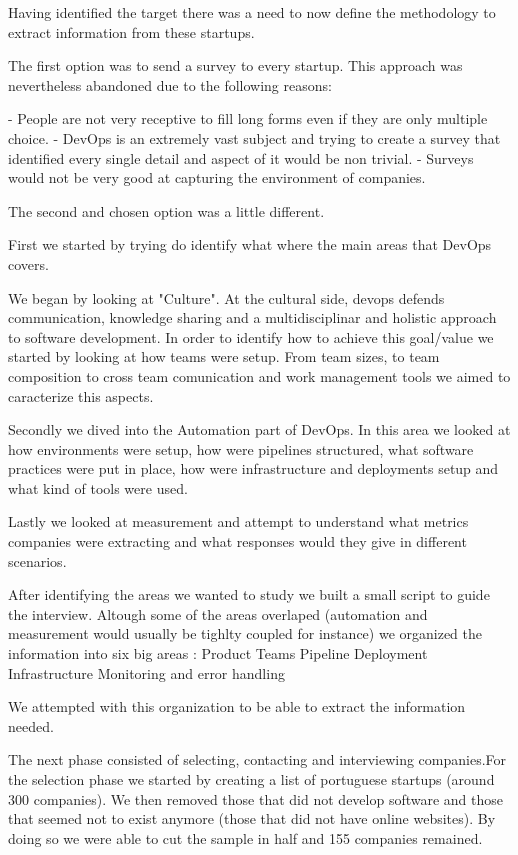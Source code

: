Having identified the target there was a need to now define the methodology to extract information from these startups. 

The first option was to send a survey to every startup. This approach was nevertheless abandoned due to the following reasons:
	
	- People are not very receptive to fill long forms even if they are only multiple choice.
	- DevOps is an extremely vast subject and trying to create a survey that identified every single detail and aspect of it would be non trivial.
	- Surveys would not be very good at capturing the environment of companies.

The second and chosen option was a little different. 

First we started by trying do identify what where the main areas that DevOps covers. 

We began by looking at "Culture". At the cultural side, devops defends communication, knowledge sharing and a multidisciplinar and holistic approach to software development. In order to identify how to achieve this goal/value we started by looking at how teams were setup. From team sizes, to team composition to cross team comunication and work management tools we aimed to caracterize this aspects. 

Secondly we dived into the Automation part of DevOps. In this area we looked at how environments were setup, how were pipelines structured, what software practices were put in place, how were infrastructure and deployments setup and what kind of tools were used.

Lastly we looked at measurement and attempt to understand what metrics companies were extracting and what responses would they give in different scenarios.

After identifying the areas we wanted to study we built a small script to guide the interview. Altough some of the areas overlaped (automation and measurement would usually be tighlty coupled for instance) we organized the information into six big areas :
	Product 
	Teams
	Pipeline
	Deployment
	Infrastructure
	Monitoring and error handling

We attempted with this organization to be able to extract the information needed.

The next phase consisted of selecting, contacting and interviewing companies.For the selection phase we started by creating a list of portuguese startups (around 300 companies). We then removed those that did not develop software and those that seemed not to exist anymore (those that did not have online websites). By doing so we were able to cut the sample in half and 155 companies remained.

